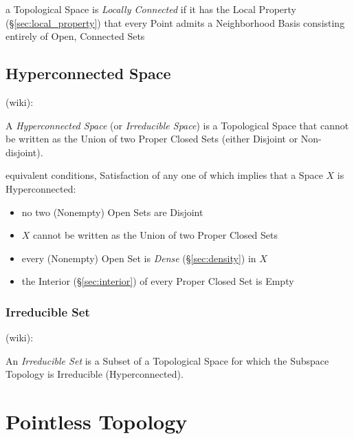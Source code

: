 a Topological Space is \emph{Locally Connected} if it has the Local Property
(\S\ref{sec:local_property}) that every Point admits a Neighborhood Basis
consisting entirely of Open, Connected Sets



\subsection{Hyperconnected Space}\label{sec:hyperconnected_space}

(wiki):

A \emph{Hyperconnected Space} (or \emph{Irreducible Space}) is a Topological
Space that cannot be written as the Union of two Proper Closed Sets (either
Disjoint or Non-disjoint).

equivalent conditions, Satisfaction of any one of which implies that a Space
$X$ is Hyperconnected:
\begin{itemize}
  \item no two (Nonempty) Open Sets are Disjoint
  \item $X$ cannot be written as the Union of two Proper Closed Sets
  \item every (Nonempty) Open Set is \emph{Dense} (\S\ref{sec:density}) in $X$
  \item the Interior (\S\ref{sec:interior}) of every Proper Closed Set is Empty
\end{itemize}



\subsubsection{Irreducible Set}\label{sec:irreducible_set}

(wiki):

An \emph{Irreducible Set} is a Subset of a Topological Space for which the
Subspace Topology is Irreducible (Hyperconnected).



\section{Pointless Topology}\label{sec:pointless_topology}

